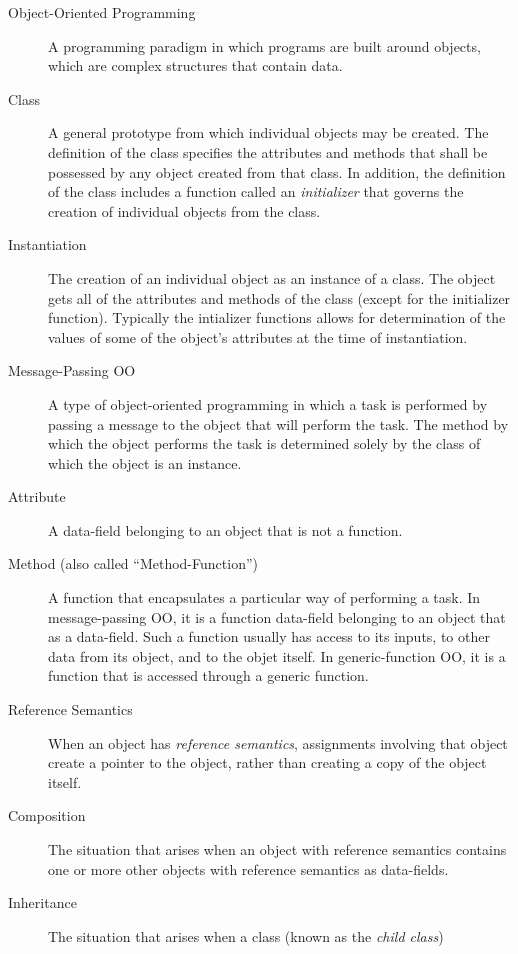 \documentclass[]{book}
\theoremstyle{definition}
\theoremstyle{definition}
\theoremstyle{definition}
\theoremstyle{remark}
\begin{document}
{\begin{description}
\item[Object-Oriented Programming ]
A programming paradigm in which programs are built around objects, which
are complex structures that contain data.
\item[Class ]
A general prototype from which individual objects may be created. The
definition of the class specifies the attributes and methods that shall
be possessed by any object created from that class. In addition, the
definition of the class includes a function called an \emph{initializer}
that governs the creation of individual objects from the class.
\item[Instantiation ]
The creation of an individual object as an instance of a class. The
object gets all of the attributes and methods of the class (except for
the initializer function). Typically the intializer functions allows for
determination of the values of some of the object's attributes at the
time of instantiation.
\item[Message-Passing OO ]
A type of object-oriented programming in which a task is performed by
passing a message to the object that will perform the task. The method
by which the object performs the task is determined solely by the class
of which the object is an instance.
\item[Attribute ]
A data-field belonging to an object that is not a function.
\item[Method (also called ``Method-Function'') ]
A function that encapsulates a particular way of performing a task. In
message-passing OO, it is a function data-field belonging to an object
that as a data-field. Such a function usually has access to its inputs,
to other data from its object, and to the objet itself. In
generic-function OO, it is a function that is accessed through a generic
function.
\item[Reference Semantics ]
When an object has \emph{reference semantics}, assignments involving
that object create a pointer to the object, rather than creating a copy
of the object itself.
\item[Composition ]
The situation that arises when an object with reference semantics
contains one or more other objects with reference semantics as
data-fields.
\item[Inheritance ]
The situation that arises when a class (known as the \emph{child class})

\end{description}}
\end{document}
